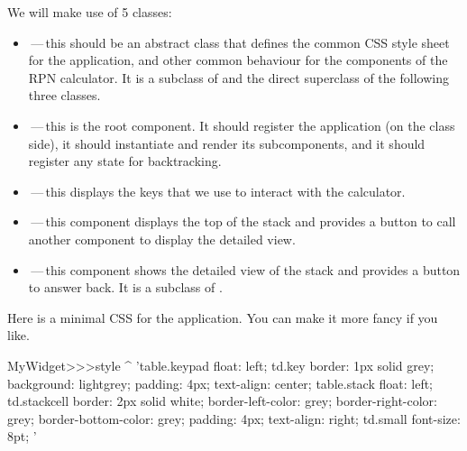 \documentclass[a4paper,10pt,twoside]{book}
\begin{document}
We will make use of 5 classes:
\begin{itemize}
  \item {}\,---\,this should be an abstract class that defines the common CSS style sheet for the application, and other common behaviour for the components of the RPN calculator.
  It is a subclass of  and the direct superclass of the following three classes.
  \item {}\,---\,this is the root component.
  It should register the application (on the class side), it should instantiate and render its subcomponents, and it should register any state for backtracking.
  \item {}\,---\,this displays the keys that we use to interact with the calculator.
  \item {}\,---\,this component displays the top of the stack and provides a button to call another component to display the detailed view.
  \item {}\,---\,this component shows the detailed view of the stack and provides a button to answer back.
  It is a subclass of .
\end{itemize}


Here is a minimal CSS for the application.
You can make it more fancy if you like.
\begin{code}{}
MyWidget>>>style
	^ 'table.keypad { float: left; }
td.key {
	border: 1px solid grey;
	background: lightgrey;
	padding: 4px;
	text-align: center;
}
table.stack { float: left; }
td.stackcell {
	border: 2px solid white;
	border-left-color: grey;
	border-right-color: grey;
	border-bottom-color: grey;
	padding: 4px;
	text-align: right;
}
td.small { font-size: 8pt; }'
\end{code}

\end{document}
